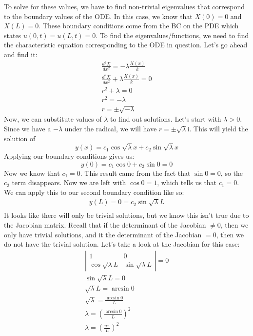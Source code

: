 \documentclass{article}
\begin{document}
\indent To solve for these values, we have to find non-trivial eigenvalues that correspond to the boundary values of the ODE. In this case, we know that $X(0) = 0$ and $X(L) = 0$. These boundary conditions come from the BC on the PDE which states $u(0,t) = u(L,t) = 0$. To find the eigenvalues/functions, we need to find the characteristic equation corresponding to the ODE in question. Let's go ahead and find it:
\begin{gather*}
\frac{d^{2}X}{dx^{2}} = -\lambda \frac{X(x)}{k}\\
\frac{d^{2}X}{dx^{2}}  + \lambda \frac{X(x)}{k} = 0\\
r^{2} + \lambda = 0\\
r^{2} = -\lambda\\
r = \pm \sqrt{- \lambda}
\end{gather*}
\indent Now, we can substitute values of $\lambda$ to find out solutions. Let's start with $\lambda > 0$. Since we have a $-\lambda$ under the radical, we will have $r = \pm \sqrt{\lambda} \mathrm{i}$. This will yield the solution of 
\[
y(x) = c_{1}\cos{\sqrt{\lambda}x} + c_{2}\sin{\sqrt{\lambda}x}
\]
\noindent Applying our boundary conditions gives us:
\[
y(0) = c_{1}\cos{0} + c_{2}\sin{0} = 0
\]
\noindent Now we know that $c_{1} = 0$. This result came from the fact that $\sin{0} = 0$, so the $c_{2}$ term disappears. Now we are left with $\cos{0} = 1$, which tells us that $c_{1} = 0$. We can apply this to our second boundary condition like so:
\begin{gather*}
y(L) = 0 = c_{2}\sin{\sqrt{\lambda}L}\\
\end{gather*}
\noindent It looks like there will only be trivial solutions, but we know this isn't true due to the Jacobian matrix. Recall that if the determinant of the Jacobian $\neq 0$, then we only have trivial solutions, and it the determinant of the Jacobian $= 0$, then we do not have the trivial solution. Let's take a look at the Jacobian for this case: 
\begin{gather*}
\left| 
\begin{array}{cc}
1 & 0\\
\cos{\sqrt{\lambda}L} & \sin{\sqrt{\lambda}L}
\end{array}
\right| = 0\\
\sin{\sqrt{\lambda}L} = 0\\
\sqrt{\lambda}L = \arcsin{0}\\
\sqrt{\lambda} = \frac{\arcsin{0}}{L}\\
\lambda = \left(\frac{\arcsin{0}}{L}\right)^{2}\\
\lambda = \left(\frac{n\pi}{L}\right)^{2}
\end{gather*}
\end{document}
